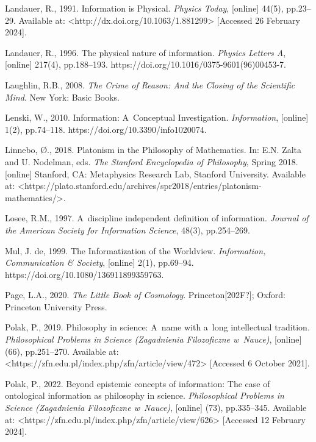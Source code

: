 Landauer, R., 1991. Information is Physical. \textit{Physics Today}, [online] 44(5), pp.23–29. Available at: {\textless}http://dx.doi.org/10.1063/1.881299{\textgreater} [Accessed 26 February 2024].



Landauer, R., 1996. The physical nature of information. \textit{Physics Letters A}, [online] 217(4), pp.188–193. https://doi.org/10.1016/0375-9601(96)00453-7.



Laughlin, R.B., 2008. \textit{The Crime of Reason: And the Closing of the Scientific Mind}. New York: Basic Books.



Lenski, W., 2010. Information: A~Conceptual Investigation. \textit{Information}, [online] 1(2), pp.74–118. https://doi.org/10.3390/info1020074.



Linnebo, Ø., 2018. Platonism in the Philosophy of Mathematics. In: E.N. Zalta and U. Nodelman, eds. \textit{The Stanford Encyclopedia of Philosophy}, Spring 2018. [online] Stanford, CA: Metaphysics Research Lab, Stanford University. Available at: {\textless}https://plato.stanford.edu/archives/spr2018/entries/platonism-mathematics/{\textgreater}.



Losee, R.M., 1997. A~discipline independent definition of information. \textit{Journal of the American Society for Information Science}, 48(3), pp.254–269.



Mul, J. de, 1999. The Informatization of the Worldview. \textit{Information, Communication \& Society}, [online] 2(1), pp.69–94. https://doi.org/10.1080/136911899359763.



Page, L.A., 2020. \textit{The Little Book of Cosmology}. Princeton[202F?]; Oxford: Princeton University Press.



Polak, P., 2019. Philosophy in science: A~name with a~long intellectual tradition. \textit{Philosophical Problems in Science (Zagadnienia Filozoficzne w~Nauce)}, [online] (66), pp.251–270. Available at: {\textless}https://zfn.edu.pl/index.php/zfn/article/view/472{\textgreater} [Accessed 6 October 2021].



Polak, P., 2022. Beyond epistemic concepts of information: The case of ontological information as philosophy in science. \textit{Philosophical Problems in Science (Zagadnienia Filozoficzne w~Nauce)}, [online] (73), pp.335–345. Available at: {\textless}https://zfn.edu.pl/index.php/zfn/article/view/626{\textgreater} [Accessed 12 February 2024].



